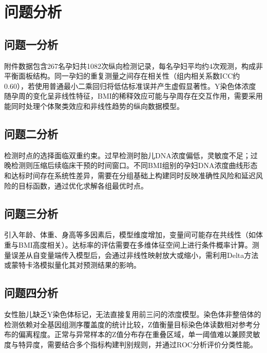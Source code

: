 \section{问题分析}

\subsection{问题一分析}

附件数据包含267名孕妇共1082次纵向检测记录，每名孕妇平均约4次观测，构成非平衡面板结构。同一孕妇的重复测量之间存在相关性（组内相关系数ICC约0.60），若使用普通最小二乘回归将低估标准误并产生虚假显著性。Y染色体浓度随孕周的变化呈非线性特征，BMI的稀释效应可能与孕周存在交互作用，需要采用能同时处理个体聚类效应和非线性趋势的纵向数据模型。

\subsection{问题二分析}

检测时点的选择面临双重约束。过早检测时胎儿DNA浓度偏低，灵敏度不足；过晚检测则压缩后续临床干预的时间窗口。不同BMI组别的孕妇DNA浓度曲线形态和达标时间存在系统性差异，需要在分组基础上构建同时反映准确性风险和延迟风险的目标函数，通过优化求解各组最优时点。

\subsection{问题三分析}

引入年龄、体重、身高等多因素后，模型维度增加，变量间可能存在共线性（如体重与BMI高度相关）。达标率的评估需要在多维体征空间上进行条件概率计算。测量误差从自变量端传入模型后，会通过非线性映射放大或缩小，需利用Delta方法或蒙特卡洛模拟量化其对预测结果的影响。

\subsection{问题四分析}

女性胎儿缺乏Y染色体标记，无法直接复用前三问的浓度模型。染色体非整倍体的检测依赖对全基因组测序覆盖度的统计比较，Z值衡量目标染色体读数相对参考分布的偏离程度。正常与异常样本的Z值分布存在重叠区域，单一阈值难以兼顾灵敏度与特异度，需要结合多个指标构建判别规则，并通过ROC分析评价分类性能。
